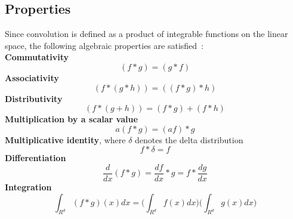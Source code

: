 \subsection{Properties}
\label{sec:convolution:mathematics:properties}
Since convolution is defined as a product of integrable functions on the linear space, the following algebraic properties are satisfied~\citep{Bracewell2000}:\\
\textbf{Commutativity}
\begin{equation}
(f * g)=(g * f)
\end{equation}
\textbf{Associativity}
\begin{equation}
(f * (g * h))=((f * g) * h)
\end{equation}
\textbf{Distributivity}
\begin{equation}
(f * (g + h))=(f * g) + (f * h)
\end{equation}
\textbf{Multiplication by a scalar value}
\begin{equation}
a (f * g) = (af) * g
\end{equation}
\textbf{Multiplicative identity}, where $\delta$ denotes the delta distribution 
\begin{equation}
f * \delta = f
\end{equation}
\textbf{Differentiation}
\begin{equation}
\frac{d}{dx}(f * g) = \frac{df}{dx} * g = f * \frac{dg}{dx}
\end{equation}
\textbf{Integration}
\begin{equation}
\int_{R^d} (f * g)(x)dx = \bigg(\int_{R^d} f(x)dx\bigg)\bigg(\int_{R^d} g(x)dx\bigg)
\end{equation}
